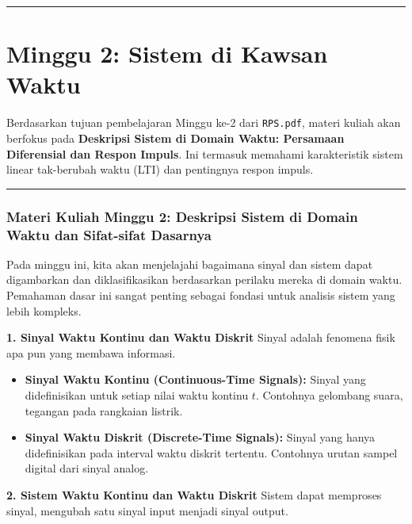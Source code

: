\documentclass[
  letterpaper,
  DIV=11,
  numbers=noendperiod]{scrreprt}
\providecommand{\tightlist}{%
  \setlength{\itemsep}{0pt}\setlength{\parskip}{0pt}}
\begin{document}
\begin{center}\rule{0.5\linewidth}{0.5pt}\end{center}


\chapter{Minggu 2: Sistem di Kawsan
Waktu}\label{minggu-2-sistem-di-kawsan-waktu}

Berdasarkan tujuan pembelajaran Minggu ke-2 dari \texttt{RPS.pdf},
materi kuliah akan berfokus pada \textbf{Deskripsi Sistem di Domain
Waktu: Persamaan Diferensial dan Respon Impuls}. Ini termasuk memahami
karakteristik sistem linear tak-berubah waktu (LTI) dan pentingnya
respon impuls.

\begin{center}\rule{0.5\linewidth}{0.5pt}\end{center}

\subsection{Materi Kuliah Minggu 2: Deskripsi Sistem di Domain Waktu dan
Sifat-sifat
Dasarnya}\label{materi-kuliah-minggu-2-deskripsi-sistem-di-domain-waktu-dan-sifat-sifat-dasarnya}

Pada minggu ini, kita akan menjelajahi bagaimana sinyal dan sistem dapat
digambarkan dan diklasifikasikan berdasarkan perilaku mereka di domain
waktu. Pemahaman dasar ini sangat penting sebagai fondasi untuk analisis
sistem yang lebih kompleks.

\textbf{1. Sinyal Waktu Kontinu dan Waktu Diskrit} Sinyal adalah
fenomena fisik apa pun yang membawa informasi.

\begin{itemize}
\tightlist
\item
  \textbf{Sinyal Waktu Kontinu (Continuous-Time Signals):} Sinyal yang
  didefinisikan untuk setiap nilai waktu kontinu \(t\). Contohnya
  gelombang suara, tegangan pada rangkaian listrik.
\item
  \textbf{Sinyal Waktu Diskrit (Discrete-Time Signals):} Sinyal yang
  hanya didefinisikan pada interval waktu diskrit tertentu. Contohnya
  urutan sampel digital dari sinyal analog.
\end{itemize}

\textbf{2. Sistem Waktu Kontinu dan Waktu Diskrit} Sistem dapat
memproses sinyal, mengubah satu sinyal input menjadi sinyal output.
\end{document}
